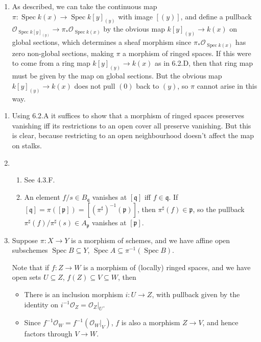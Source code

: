 \documentclass{report}
\newcommand{\p}{\mathfrak{p}}
\newcommand{\q}{\mathfrak{q}}
\renewcommand{\O}{\mathscr{O}} %
\DeclareMathOperator{\Spec}{Spec}
\begin{document}
\begin{enumerate}[label=\textbf{6.2.\Alph*.}]
	\item As described, we can take the continuous map
	      $\pi:\Spec k(x)\to\Spec k[y]_{(y)}$ with image $[(y)]$, and define a
	      pullback $\O_{\Spec k[y]_{(y)}}\to\pi_*\O_{\Spec k(x)}$ by the obvious
	      map $k[y]_{(y)}\to k(x)$ on global sections, which determines a sheaf
	      morphism since $\pi_*\O_{\Spec k(x)}$ has zero non-global sections,
	      making $\pi$ a morphism of ringed spaces. If this were to come from a
	      ring map $k[y]_{(y)}\to k(x)$ as in 6.2.D, then that ring map must be
	      given by the map on global sections. But the obvious map
	      $k[y]_{(y)}\to k(x)$ does not pull $(0)$ back to $(y)$, so $\pi$ cannot
	      arise in this way.
\end{enumerate}

\begin{enumerate}[label=\textbf{6.3.\Alph*.}]
	\item Using 6.2.A it suffices to show that a morphism of ringed spaces
	      preserves vanishing iff its restrictions to an open cover all preserve
	      vanishing. But this is clear, because restricting to an open
	      neighbourhood doesn't affect the map on stalks.

	\item
	      \begin{enumerate}[label=(\alph*)]
		      \item See 4.3.F.

		      \item An element $f/s\in B_\q$ vanishes at $[\q]$ iff $f\in\q$. If
		            $[\q]=\pi([\p])=[(\pi^\sharp)^{-1}(\p)]$, then
		            $\pi^\sharp(f)\in\p$, so the pullback
		            $\pi^\sharp(f)/\pi^\sharp(s)\in A_\p$ vanishes at $[\p]$.
	      \end{enumerate}

	\item Suppose $\pi:X\to Y$ is a morphism of schemes, and
	      we have affine open subschemes $\Spec B\subseteq Y$,
	      $\Spec A\subseteq \pi^{-1}(\Spec B)$.

	      Note that if $f:Z\to W$ is a morphism of (locally) ringed spaces, and we
	      have open sets $U\subseteq Z$, $f(Z)\subseteq V\subseteq W$, then
	      \begin{itemize}
		      \item There is an inclusion morphism $i:U\to Z$, with pullback
		            given by the identity on $i^{-1}\O_Z=\O_Z|_U$.

		      \item Since $f^{-1}\O_W=f^{-1}(\O_W|_V)$, $f$ is also a morphism
		            $Z\to V$, and hence factors through $V\to W$.
	      \end{itemize}


\end{enumerate}
\end{document}
